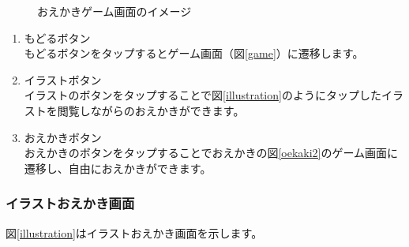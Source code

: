 \documentclass[a4j]{jarticle}
\begin{document}
\begin{figure}[H]
    \begin{center}
    \caption {おえかきゲーム画面のイメージ}
    \label{oekaki}
    \end{center}
\end{figure}

\begin{enumerate}
  \renewcommand{\labelenumi}{\textcircled{\scriptsize \theenumi}}
\item もどるボタン\\
  もどるボタンをタップするとゲーム画面（図\ref{game}）に遷移します。
\item イラストボタン\\
  イラストのボタンをタップすることで図\ref{illustration}のようにタップしたイラストを閲覧しながらのおえかきができます。
\item おえかきボタン\\
  おえかきのボタンをタップすることでおえかきの図\ref{oekaki2}のゲーム画面に遷移し、自由におえかきができます。
\end{enumerate}

\newpage
\subsubsection{イラストおえかき画面}
図\ref{illustration}はイラストおえかき画面を示します。\\
\end{document}
